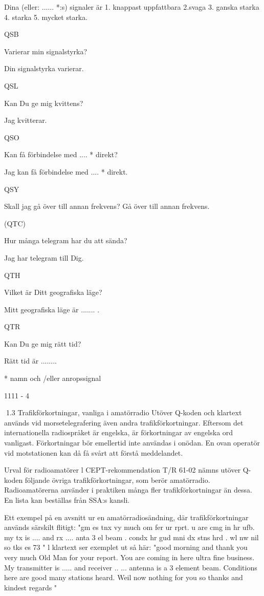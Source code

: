 \documentclass[a4paper,twoside,twocolumn,openright]{book}
\begin{document}
{{{{{Dina (eller: ...... *:s) signaler är
1. knappast uppfattbara
2.svaga
3. ganska starka
4. starka
5. mycket starka.

QSB

Varierar min signalstyrka?

Din signalstyrka varierar.

QSL

Kan Du ge mig kvittens?

Jag kvitterar.

QSO

Kan
få förbindelse med
.... * direkt?

Jag kan få förbindelse med .... * direkt.

QSY

Skall jag gå över till annan frekvens? Gå över till annan frekvens.

(QTC)

Hur många telegram har du att
sända?

Jag har telegram till Dig.

QTH

Vilket är Ditt geografiska läge?

Mitt geografiska läge är ....... .

QTR

Kan Du ge mig rätt tid?

Rätt tid är ........

* namn och /eller anropssignal

1111 - 4

1.3 Trafikförkortningar, vanliga i amatörradio
Utöver Q-koden och klartext används vid
morsetelegrafering även andra trafikförkortningar. Eftersom det internationella radiospråket är engelska, är förkortningar av engelska ord vanligast.
Förkortningar bör emellertid inte användas i onödan. En ovan operatör vid motstationen kan då få svårt att förstå meddelandet.

Urval för radioamatörer
l CEPT-rekommendation T/R 61-02 nämns
utöver Q-koden följande övriga trafikförkortningar, som berör amatörradio.
Radioamatörerna använder i praktiken
många fler trafikförkortningar än dessa. En
lista kan beställas från SSA:s kansli.

Ett exempel på en avsnitt ur en amatörradiosändning, där trafikförkortningar används
särskilt flitigt:
"gm es tnx vy much om fer ur rprt. u are
cmg in hr ufb. my tx is .... and rx .... anta 3
el beam . condx hr gud mni dx stns hrd . wl
nw nil so tks es 73 "
l klartext ser exemplet ut så här:
"good morning and thank you very much
Old Man for your report. You are coming in
here ultra fine business. My transmitter is .....
and receiver .. ... antenna is a 3 element
beam. Conditions here are good many
stations heard. Weil now nothing for you so
thanks and kindest regards "

}}}}}
\end{document}
